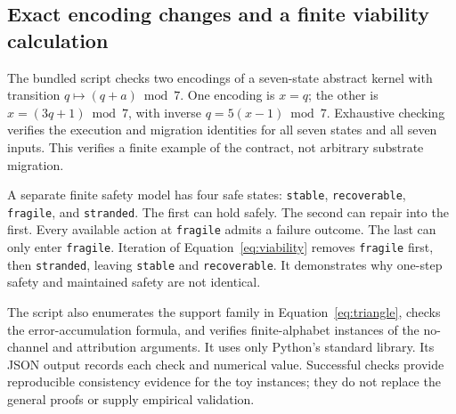 \documentclass[11pt,a4paper]{article}
\theoremstyle{definition}
\theoremstyle{remark}
\begin{document}
\subsection{Exact encoding changes and a finite viability calculation}
The bundled script checks two encodings of a seven-state abstract kernel with transition $q\mapsto(q+a)\bmod7$. One encoding is $x=q$; the other is $x=(3q+1)\bmod7$, with inverse $q=5(x-1)\bmod7$. Exhaustive checking verifies the execution and migration identities for all seven states and all seven inputs. This verifies a finite example of the contract, not arbitrary substrate migration.

A separate finite safety model has four safe states: \texttt{stable}, \texttt{recoverable}, \texttt{fragile}, and \texttt{stranded}. The first can hold safely. The second can repair into the first. Every available action at \texttt{fragile} admits a failure outcome. The last can only enter \texttt{fragile}. Iteration of Equation~\eqref{eq:viability} removes \texttt{fragile} first, then \texttt{stranded}, leaving \texttt{stable} and \texttt{recoverable}. It demonstrates why one-step safety and maintained safety are not identical.

The script also enumerates the support family in Equation~\eqref{eq:triangle}, checks the error-accumulation formula, and verifies finite-alphabet instances of the no-channel and attribution arguments. It uses only Python's standard library. Its JSON output records each check and numerical value. Successful checks provide reproducible consistency evidence for the toy instances; they do not replace the general proofs or supply empirical validation.

\clearpage
\end{document}
